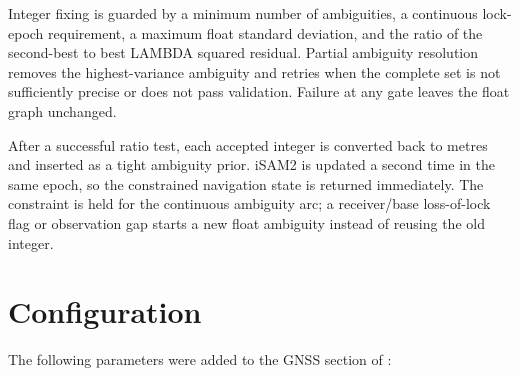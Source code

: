 \documentclass[11pt,a4paper]{article}
\newcommand{\code}[1]{\texttt{\detokenize{#1}}}
\begin{document}
Integer fixing is guarded by a minimum number of ambiguities, a continuous
lock-epoch requirement, a maximum float standard deviation, and the ratio of
the second-best to best LAMBDA squared residual.  Partial ambiguity resolution
removes the highest-variance ambiguity and retries when the complete set is
not sufficiently precise or does not pass validation.  Failure at any gate
leaves the float graph unchanged.

After a successful ratio test, each accepted integer is converted back to
metres and inserted as a tight ambiguity prior.  iSAM2 is updated a second
time in the same epoch, so the constrained navigation state is returned
immediately.  The constraint is held for the continuous ambiguity arc; a
receiver/base loss-of-lock flag or observation gap starts a new float
ambiguity instead of reusing the old integer.

\section{Configuration}

The following parameters were added to the GNSS section of
\code{config/avia.yaml}:
\end{document}

